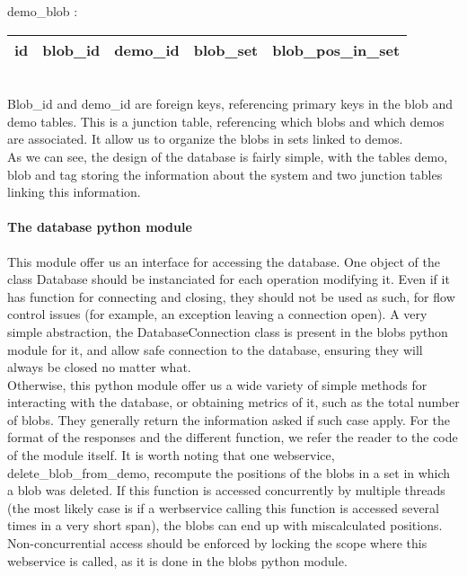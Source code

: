 demo\_blob :

\begin{tabular}{ | l | l | l | l | l | }
  \hline
  id & blob\_id & demo\_id & blob\_set & blob\_pos\_in\_set \\
  \hline
\end{tabular}\\
Blob\_id and demo\_id are foreign keys, referencing primary keys in the blob and demo tables. This is a junction table, referencing which blobs and which demos are associated. It allow us to organize the blobs in sets linked to demos.\\

As we can see, the design of the database is fairly simple, with the tables demo, blob and tag storing the information about the system and two junction tables linking this information.

\paragraph{The database python module\\}
This module offer us an interface for accessing the database. One object of the class Database should be instanciated for each operation modifying it. Even if it has function for connecting and closing, they should not be used as such, for flow control issues (for example, an exception leaving a connection open). A very simple abstraction, the DatabaseConnection class is present in the blobs python module for it, and allow safe connection to the database, ensuring they will always be closed no matter what. \\

Otherwise, this python module offer us a wide variety of simple methods for interacting with the database, or obtaining metrics of it, such as the total number of blobs. They generally return the information asked if such case apply. For the format of the responses and the different function, we refer the reader to the code of the module itself. It is worth noting that one webservice, delete\_blob\_from\_demo, recompute the positions of the blobs in a set in which a blob was deleted. If this function is accessed concurrently by multiple threads (the most likely case is if a werbservice calling this function is accessed several times in a very short span), the blobs can end up with miscalculated positions. Non-concurrential access should be enforced by locking the scope where this webservice is called, as it is done in the blobs python module. \\

